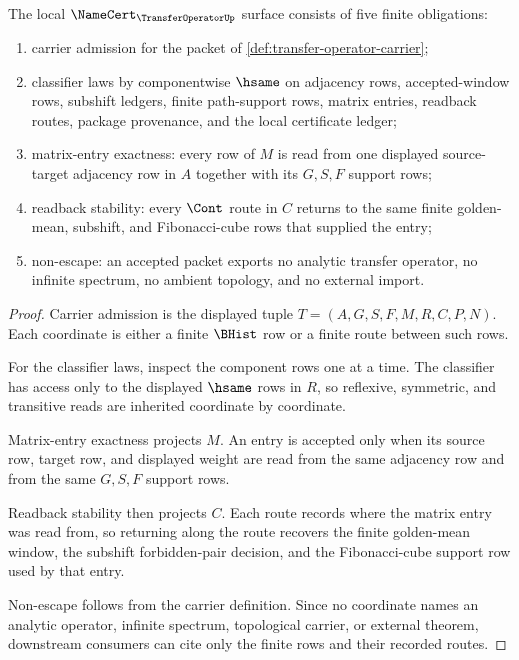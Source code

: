 \begin{theorem}
\label{thm:transfer-operator-namecert-obligations}
The local $\NameCert_{\TransferOperatorUp}$ surface consists of five finite obligations:
\begin{enumerate}
\item carrier admission for the packet of \autoref{def:transfer-operator-carrier};
\item classifier laws by componentwise $\hsame$ on adjacency rows, accepted-window rows, subshift ledgers, finite path-support rows, matrix entries, readback routes, package provenance, and the local certificate ledger;
\item matrix-entry exactness: every row of $M$ is read from one displayed source-target adjacency row in $A$ together with its $G,S,F$ support rows;
\item readback stability: every $\Cont$ route in $C$ returns to the same finite golden-mean, subshift, and Fibonacci-cube rows that supplied the entry;
\item non-escape: an accepted packet exports no analytic transfer operator, no infinite spectrum, no ambient topology, and no external import.
\end{enumerate}
\end{theorem}
\begin{proof}
Carrier admission is the displayed tuple $T=(A,G,S,F,M,R,C,P,N)$. Each coordinate is either a finite $\BHist$ row or a finite route between such rows.

For the classifier laws, inspect the component rows one at a time. The classifier has access only to the displayed $\hsame$ rows in $R$, so reflexive, symmetric, and transitive reads are inherited coordinate by coordinate.

Matrix-entry exactness projects $M$. An entry is accepted only when its source row, target row, and displayed weight are read from the same adjacency row and from the same $G,S,F$ support rows.

Readback stability then projects $C$. Each route records where the matrix entry was read from, so returning along the route recovers the finite golden-mean window, the subshift forbidden-pair decision, and the Fibonacci-cube support row used by that entry.

Non-escape follows from the carrier definition. Since no coordinate names an analytic operator, infinite spectrum, topological carrier, or external theorem, downstream consumers can cite only the finite rows and their recorded routes.
\end{proof}

